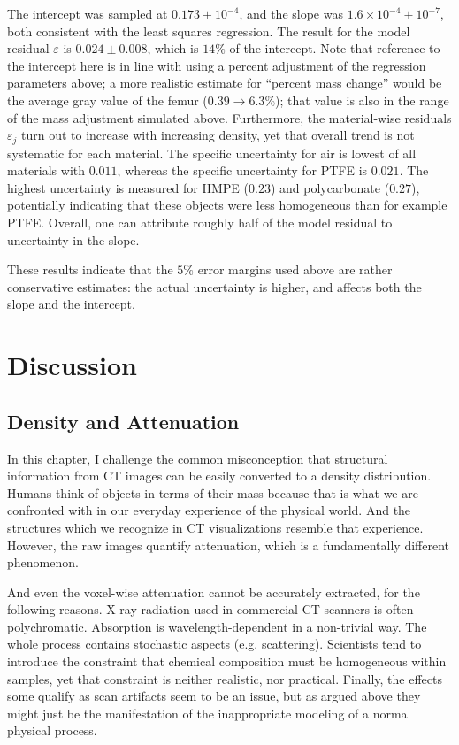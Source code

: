The intercept was sampled at \(0.173\pm 10^{-4}\), and the slope was \(1.6\times 10^{-4} \pm 10^{-7}\), both consistent with the least squares regression.
The result for the model residual \(\varepsilon\) is \(0.024 \pm 0.008\), which is \(14\%\) of the intercept.
Note that reference to the intercept here is in line with using a percent adjustment of the regression parameters above; a more realistic estimate for ``percent mass change'' would be the average gray value of the femur (\(0.39 \longrightarrow 6.3\%\)); that value is also in the range of the mass adjustment simulated above.
Furthermore, the material-wise residuals \(\varepsilon_{j}\) turn out to increase with increasing density, yet that overall trend is not systematic for each material.
The specific uncertainty for air is lowest of all materials with \(0.011\), whereas the specific uncertainty for PTFE is \(0.021\).
The highest uncertainty is measured for HMPE (\(0.23\)) and polycarbonate (\(0.27\)), potentially indicating that these objects were less homogeneous than for example PTFE.
Overall, one can attribute roughly half of the model residual to uncertainty in the slope.

These results indicate that the \(5\%\) error margins used above are rather conservative estimates: the actual uncertainty is higher, and affects both the slope and the intercept.


\section{Discussion}
\label{sec:orgfa8ea5f}
\subsection{Density and Attenuation}
\label{sec:org294452d}
In this chapter, I challenge the common misconception that structural information from CT images can be easily converted to a density distribution.
Humans think of objects in terms of their mass because that is what we are confronted with in our everyday experience of the physical world.
And the structures which we recognize in CT visualizations resemble that experience.
However, the raw images quantify attenuation, which is a fundamentally different phenomenon.


And even the voxel-wise attenuation cannot be accurately extracted, for the following reasons.
X-ray radiation used in commercial CT scanners is often polychromatic.
Absorption is wavelength-dependent in a non-trivial way.
The whole process contains stochastic aspects (e.g. scattering).
Scientists tend to introduce the constraint that chemical composition must be homogeneous within samples, yet that constraint is neither realistic, nor practical.
Finally, the effects some qualify as scan artifacts seem to be an issue, but as argued above they might just be the manifestation of the inappropriate modeling of a normal physical process.


